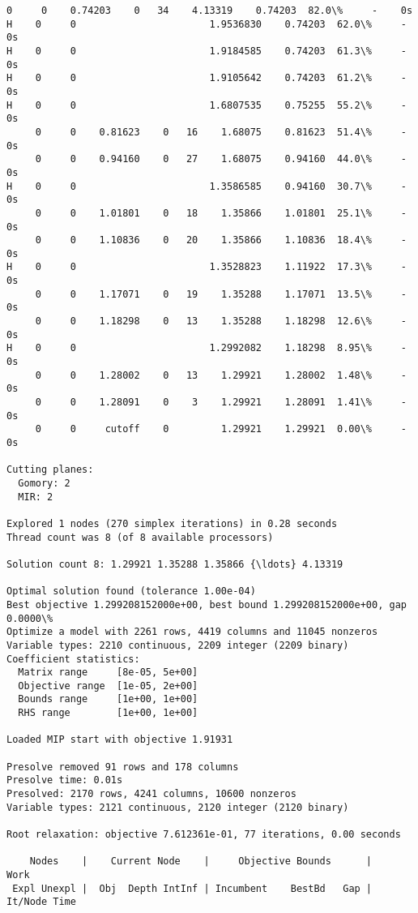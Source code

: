 \documentclass[11pt]{article}
\begin{document}
\begin{Verbatim}[commandchars=\\\{\}]
     0     0    0.74203    0   34    4.13319    0.74203  82.0\%     -    0s
H    0     0                       1.9536830    0.74203  62.0\%     -    0s
H    0     0                       1.9184585    0.74203  61.3\%     -    0s
H    0     0                       1.9105642    0.74203  61.2\%     -    0s
H    0     0                       1.6807535    0.75255  55.2\%     -    0s
     0     0    0.81623    0   16    1.68075    0.81623  51.4\%     -    0s
     0     0    0.94160    0   27    1.68075    0.94160  44.0\%     -    0s
H    0     0                       1.3586585    0.94160  30.7\%     -    0s
     0     0    1.01801    0   18    1.35866    1.01801  25.1\%     -    0s
     0     0    1.10836    0   20    1.35866    1.10836  18.4\%     -    0s
H    0     0                       1.3528823    1.11922  17.3\%     -    0s
     0     0    1.17071    0   19    1.35288    1.17071  13.5\%     -    0s
     0     0    1.18298    0   13    1.35288    1.18298  12.6\%     -    0s
H    0     0                       1.2992082    1.18298  8.95\%     -    0s
     0     0    1.28002    0   13    1.29921    1.28002  1.48\%     -    0s
     0     0    1.28091    0    3    1.29921    1.28091  1.41\%     -    0s
     0     0     cutoff    0         1.29921    1.29921  0.00\%     -    0s

Cutting planes:
  Gomory: 2
  MIR: 2

Explored 1 nodes (270 simplex iterations) in 0.28 seconds
Thread count was 8 (of 8 available processors)

Solution count 8: 1.29921 1.35288 1.35866 {\ldots} 4.13319

Optimal solution found (tolerance 1.00e-04)
Best objective 1.299208152000e+00, best bound 1.299208152000e+00, gap 0.0000\%
Optimize a model with 2261 rows, 4419 columns and 11045 nonzeros
Variable types: 2210 continuous, 2209 integer (2209 binary)
Coefficient statistics:
  Matrix range     [8e-05, 5e+00]
  Objective range  [1e-05, 2e+00]
  Bounds range     [1e+00, 1e+00]
  RHS range        [1e+00, 1e+00]

Loaded MIP start with objective 1.91931

Presolve removed 91 rows and 178 columns
Presolve time: 0.01s
Presolved: 2170 rows, 4241 columns, 10600 nonzeros
Variable types: 2121 continuous, 2120 integer (2120 binary)

Root relaxation: objective 7.612361e-01, 77 iterations, 0.00 seconds

    Nodes    |    Current Node    |     Objective Bounds      |     Work
 Expl Unexpl |  Obj  Depth IntInf | Incumbent    BestBd   Gap | It/Node Time


\end{Verbatim}
\end{document}
